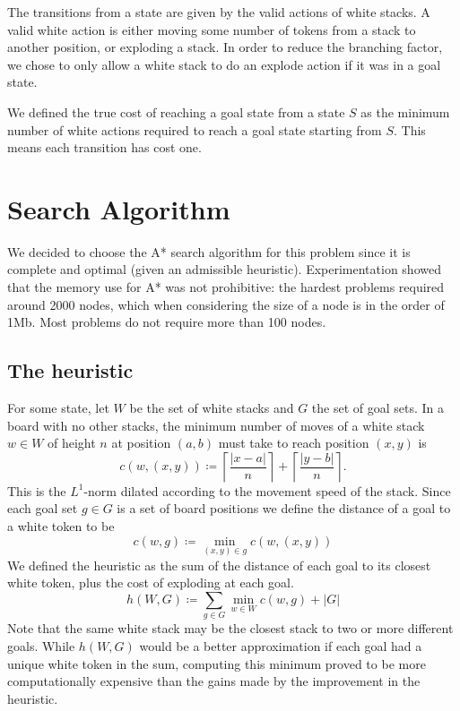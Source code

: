 \documentclass[11pt]{article}
\theoremstyle{definition}
\def\defeq{\coloneqq}
\begin{document}
    The transitions from a state are given by the valid actions of white stacks. A valid white action is either moving some number of tokens from a stack to another position, or exploding a stack. In order to reduce the branching factor, we chose to only allow a white stack to do an explode action if it was in a goal state. 
    
    We defined the true cost of reaching a goal state from a state $S$ as the minimum number of white actions required to reach a goal state starting from $S$. This means each transition has cost one. 
    
    \section{Search Algorithm}\label{sec:search-algorithm}
    We decided to choose the A* search algorithm for this problem since it is complete and optimal (given an admissible heuristic). Experimentation showed that the memory use for A* was not prohibitive: the hardest problems required around 2000 nodes, which when considering the size of a node is in the order of 1Mb. Most problems do not require more than 100 nodes.

    \subsection{The heuristic}\label{subsec:heuristic}
    
    For some state, let $W$ be the set of white stacks and $G$ the set of goal sets. In a board with no other stacks, the minimum number of moves of a white stack $w \in W$ of height $n$ at position $(a, b)$ must take to reach position $(x, y)$ is 
    \[
        c(w, (x, y)) \defeq \left\lceil  \frac{| x - a |}{n} \right\rceil + \left\lceil  \frac{| y - b |}{n} \right\rceil.
    \]
    This is the $L^1$-norm dilated according to the movement speed of the stack. Since each goal set $g \in G$ is a set of board positions we define the distance of a goal to a white token to be
    \[
        c(w, g) \defeq \min _{(x, y) \in g} c(w, (x, y))
    \] 
    We defined the heuristic as the sum of the distance of each goal to its closest white token, plus the cost of exploding at each goal.
    \[
        h(W, G) \defeq \sum _{g \in G} \min _{w\in W} c(w, g) + |G|
    \]
    Note that the same white stack may be the closest stack to two or more different goals. While $h(W, G)$ would be a better approximation if each goal had a unique white token in the sum, computing this minimum proved to be more computationally expensive than the gains made by the improvement in the heuristic.
\end{document}

